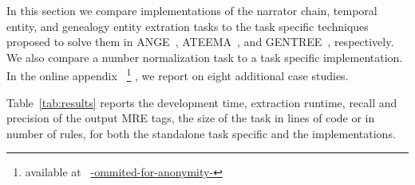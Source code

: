 In this section we compare \framework implementations of 
the narrator chain, temporal entity, and genealogy entity extration 
tasks to the task specific techniques proposed to solve them
in ANGE~\cite{ZaMaFlairs2012HadithBio}, 
ATEEMA~\cite{ZaMa2012IJCLATime},  and
GENTREE~\cite{ZaMaHaCicling2012Entity}, respectively. 
We also compare a \framework number normalization task to 
a task specific implementation. 
In the online appendix%
~\footnote{available at ~\url{-ommited-for-anonymity-}}%
, we report on eight additional \framework case studies.

Table~\ref{tab:results} reports the development time,
extraction runtime, recall and precision 
of the output MRE tags, 
the size of the task in lines of code or in number of \framework rules, 
for both the standalone task specific and the \framework implementations. 

\begin{table}[tb!]
  \centering
\caption{\framework compared to task specific applications.}
  \label{tab:results}%
\end{table}%

